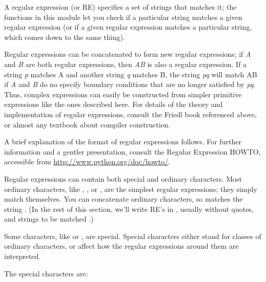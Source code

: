 A regular expression (or RE) specifies a set of strings that matches
it; the functions in this module let you check if a particular string
matches a given regular expression (or if a given regular expression
matches a particular string, which comes down to the same thing).

Regular expressions can be concatenated to form new regular
expressions; if \emph{A} and \emph{B} are both regular expressions,
then \emph{AB} is also a regular expression.  If a string \emph{p}
matches A and another string \emph{q} matches B, the string \emph{pq}
will match AB if \emph{A} and \emph{B} do no specify boundary
conditions that are no longer satisfied by \emph{pq}.  Thus, complex
expressions can easily be constructed from simpler primitive
expressions like the ones described here.  For details of the theory
and implementation of regular expressions, consult the Friedl book
referenced above, or almost any textbook about compiler construction.

A brief explanation of the format of regular expressions follows.  For
further information and a gentler presentation, consult the Regular
Expression HOWTO, accessible from \url{http://www.python.org/doc/howto/}.

Regular expressions can contain both special and ordinary characters.
Most ordinary characters, like , , or
, are the simplest regular expressions; they simply match
themselves.  You can concatenate ordinary characters, so 
matches the string .  (In the rest of this section, we'll
write RE's in , usually without quotes, and
strings to be matched .)

Some characters, like \character{|} or \character{(}, are special.
Special characters either stand for classes of ordinary characters, or
affect how the regular expressions around them are interpreted.

The special characters are:


